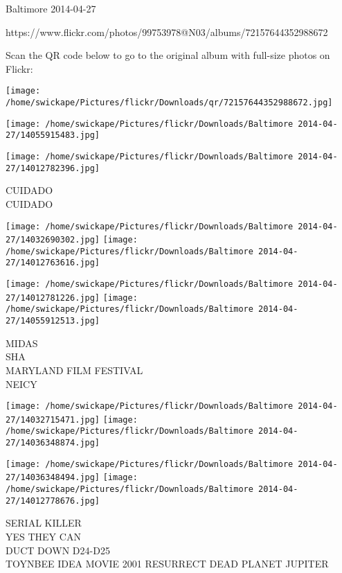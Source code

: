 \documentclass[10pt,letterpaper]{article}
\begin{document}
Baltimore 2014-04-27

https://www.flickr.com/photos/99753978@N03/albums/72157644352988672

Scan the QR code below to go to the original album with full-size photos on Flickr:

\texttt{[image: /home/swickape/Pictures/flickr/Downloads/qr/72157644352988672.jpg]}
\pagebreak

\texttt{[image: /home/swickape/Pictures/flickr/Downloads/Baltimore 2014-04-27/14055915483.jpg]}

\vspace{0.25in}
\texttt{[image: /home/swickape/Pictures/flickr/Downloads/Baltimore 2014-04-27/14012782396.jpg]}

CUIDADO\\
CUIDADO\\
\pagebreak

\texttt{[image: /home/swickape/Pictures/flickr/Downloads/Baltimore 2014-04-27/14032690302.jpg]}
\texttt{[image: /home/swickape/Pictures/flickr/Downloads/Baltimore 2014-04-27/14012763616.jpg]}

\texttt{[image: /home/swickape/Pictures/flickr/Downloads/Baltimore 2014-04-27/14012781226.jpg]}
\texttt{[image: /home/swickape/Pictures/flickr/Downloads/Baltimore 2014-04-27/14055912513.jpg]}

MIDAS\\
SHA\\
MARYLAND FILM FESTIVAL\\
NEICY\\
\pagebreak

\texttt{[image: /home/swickape/Pictures/flickr/Downloads/Baltimore 2014-04-27/14032715471.jpg]}
\texttt{[image: /home/swickape/Pictures/flickr/Downloads/Baltimore 2014-04-27/14036348874.jpg]}

\texttt{[image: /home/swickape/Pictures/flickr/Downloads/Baltimore 2014-04-27/14036348494.jpg]}
\texttt{[image: /home/swickape/Pictures/flickr/Downloads/Baltimore 2014-04-27/14012778676.jpg]}

SERIAL KILLER\\
YES THEY CAN\\
DUCT DOWN D24{-}D25\\
TOYNBEE IDEA MOVIE 2001 RESURRECT DEAD PLANET JUPITER\\
\pagebreak
\end{document}
